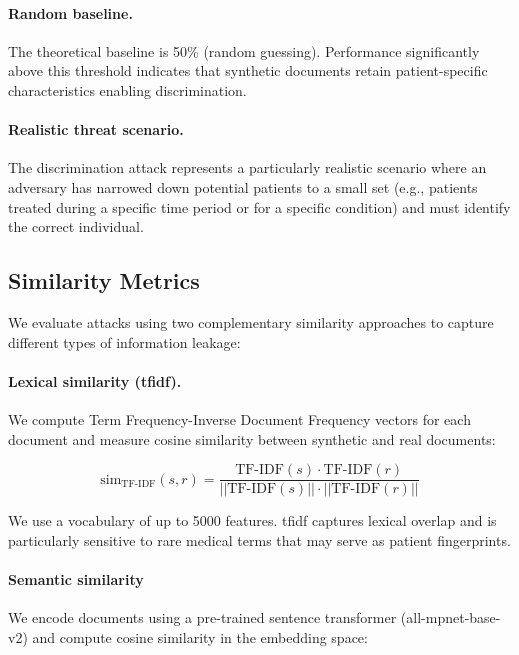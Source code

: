 \paragraph{Random baseline.} The theoretical baseline is 50\% (random guessing). Performance significantly above this threshold indicates that synthetic documents retain patient-specific characteristics enabling discrimination.

\paragraph{Realistic threat scenario.} The discrimination attack represents a particularly realistic scenario where an adversary has narrowed down potential patients to a small set (e.g., patients treated during a specific time period or for a specific condition) and must identify the correct individual.

\subsection{Similarity Metrics}
\label{subsec:similarity_metrics}

We evaluate attacks using two complementary similarity approaches to capture different types of information leakage:

\paragraph{Lexical similarity (\gls{tfidf}).} We compute Term Frequency-Inverse Document Frequency vectors for each document and measure cosine similarity between synthetic and real documents:

\begin{equation}
    \text{sim}_{\text{TF-IDF}}(s, r) = \frac{\text{TF-IDF}(s) \cdot \text{TF-IDF}(r)}{||\text{TF-IDF}(s)|| \cdot ||\text{TF-IDF}(r)||}
\end{equation}

We use a vocabulary of up to \num{5000} features. \gls{tfidf} captures lexical overlap and is particularly sensitive to rare medical terms that may serve as patient fingerprints.

\paragraph{Semantic similarity} We encode documents using a pre-trained sentence transformer (all-mpnet-base-v2) and compute cosine similarity in the embedding space:

